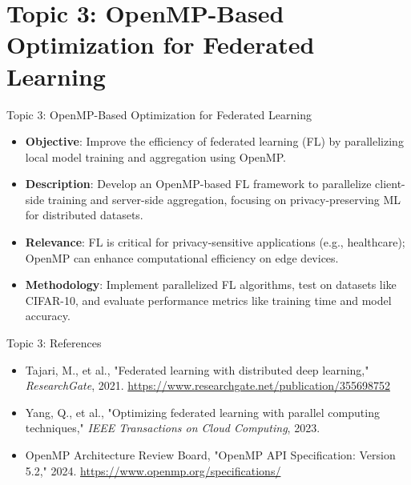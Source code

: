 \documentclass{beamer}
\begin{document}
\section{Topic 3: OpenMP-Based Optimization for Federated Learning}
\begin{frame}{Topic 3: OpenMP-Based Optimization for Federated Learning}
\begin{itemize}
    \item \textbf{Objective}: Improve the efficiency of federated learning (FL) by parallelizing local model training and aggregation using OpenMP.
    \item \textbf{Description}: Develop an OpenMP-based FL framework to parallelize client-side training and server-side aggregation, focusing on privacy-preserving ML for distributed datasets.
    \item \textbf{Relevance}: FL is critical for privacy-sensitive applications (e.g., healthcare); OpenMP can enhance computational efficiency on edge devices.
    \item \textbf{Methodology}: Implement parallelized FL algorithms, test on datasets like CIFAR-10, and evaluate performance metrics like training time and model accuracy.
\end{itemize}
\end{frame}

\begin{frame}{Topic 3: References}
\begin{itemize}
    \item 
          Tajari, M., et al., "Federated learning with distributed deep learning," \textit{ResearchGate}, 2021. \url{https://www.researchgate.net/publication/355698752}
    \item 
          Yang, Q., et al., "Optimizing federated learning with parallel computing techniques," \textit{IEEE Transactions on Cloud Computing}, 2023.
    \item 
          OpenMP Architecture Review Board, "OpenMP API Specification: Version 5.2," 2024. \url{https://www.openmp.org/specifications/}
\end{itemize}
\end{frame}
\end{document}
